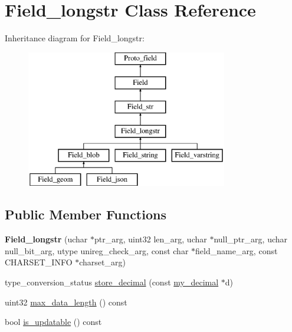 \hypertarget{classField__longstr}{}\section{Field\+\_\+longstr Class Reference}
\label{classField__longstr}
Inheritance diagram for Field\+\_\+longstr\+:\begin{figure}[H]
\begin{center}
\leavevmode
\includegraphics[height=6.000000cm]{classField__longstr}
\end{center}
\end{figure}
\subsection*{Public Member Functions}
\begin{DoxyCompactItemize}
\item 
\mbox{\label{classField__longstr_addcc1bc44635723f4885c80b6513898f}} 
{\bfseries Field\+\_\+longstr} (uchar $\ast$ptr\+\_\+arg, uint32 len\+\_\+arg, uchar $\ast$null\+\_\+ptr\+\_\+arg, uchar null\+\_\+bit\+\_\+arg, utype unireg\+\_\+check\+\_\+arg, const char $\ast$field\+\_\+name\+\_\+arg, const C\+H\+A\+R\+S\+E\+T\+\_\+\+I\+N\+FO $\ast$charset\+\_\+arg)
\item 
type\+\_\+conversion\+\_\+status \mbox{\hyperlink{classField__longstr_accc080bab51e57cdcefc594a17cb13f5}{store\+\_\+decimal}} (const \mbox{\hyperlink{classmy__decimal}{my\+\_\+decimal}} $\ast$d)
\item 
uint32 \mbox{\hyperlink{classField__longstr_a5af463c25b00c34e0d14e3780771fee0}{max\+\_\+data\+\_\+length}} () const
\item 
bool \mbox{\hyperlink{classField__longstr_af0f474a87a0c2c382e117a0d707c142a}{is\+\_\+updatable}} () const
\end{DoxyCompactItemize}
